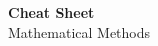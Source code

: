 \documentclass[12pt]{article}
\begin{document}
\begin{center}
  {\LARGE\bfseries Cheat Sheet}\\[0.25em]
  {\large Mathematical Methods}\\[0.15em]
\end{center}

\end{document}
